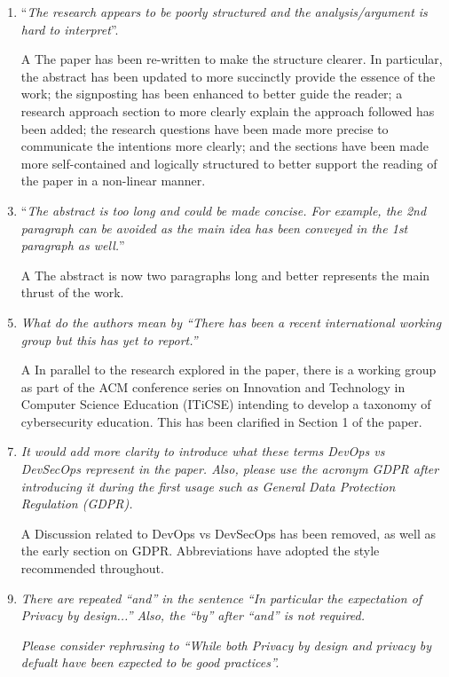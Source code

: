 \documentclass[a4paper,11pt]{article}
\begin{document}
\begin{enumerate}
\item ``{\emph{The research appears to be poorly structured and the analysis/argument is hard to interpret}}''.
\item[A]The paper has been re-written to make the structure
clearer. In particular, the abstract has been updated to more
succinctly provide the essence of the work; the signposting has been
enhanced to better guide the reader; a research approach section to
more clearly explain the approach followed has been added; the
research questions have been made more precise to communicate the
intentions more clearly; and the sections have been made more
self-contained and logically structured to better support the reading
of the paper in a non-linear manner.

\item ``{\emph{The abstract is too long and could be made concise. For example, the 2nd paragraph can be avoided as the main idea has been conveyed in the 1st paragraph as well.}}''
\item[A] The abstract is now two paragraphs long and better represents
  the main thrust of the work.

\item {\emph{What do the authors mean by ``There has been a recent international working group but this has yet to report.''}} 
\item[A] In parallel to the research explored in the paper, there is a
  working group as part of the ACM conference series on Innovation and Technology in Computer Science
  Education (ITiCSE) intending to develop a taxonomy of cybersecurity
  education. This has been clarified in Section 1 of the paper.

\item {\emph{It would add more clarity to introduce what these terms DevOps vs DevSecOps represent in the paper. Also, please use the acronym GDPR after introducing it during the first usage such as General Data Protection Regulation (GDPR).}}
\item[A] Discussion related to DevOps vs DevSecOps has been
  removed, as well as the early section on GDPR. Abbreviations have
  adopted the style recommended throughout. 

\item {\emph{There are repeated ``and'' in the sentence ``In particular the expectation of Privacy by design...'' Also, the ``by'' after ``and'' is not required.}}

{\emph{Please consider rephrasing to ``While both Privacy by design and privacy by defualt have been expected to be good practices''.}}


\end{enumerate}
\end{document}
